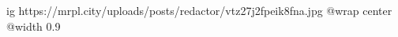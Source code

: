  
 
 
 
 

\ifcmt
  ig https://mrpl.city/uploads/posts/redactor/vtz27j2fpeik8fna.jpg
  @wrap center
  @width 0.9
\fi

